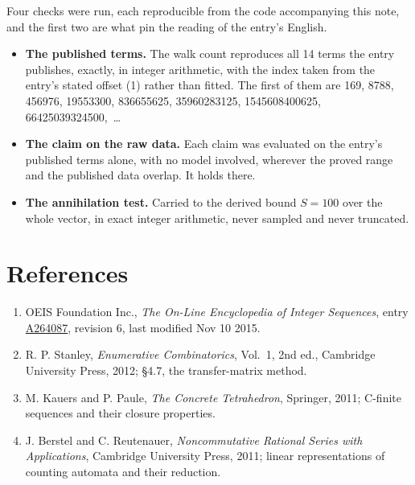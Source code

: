 \documentclass[11pt]{article}
\theoremstyle{definition}
\begin{document}
Four checks were run, each reproducible from the code accompanying this note, and the first two are what pin the reading of the entry's English.

\begin{itemize}

\item {\bfseries The published terms.} The walk count reproduces all 14 terms the entry publishes, exactly, in integer arithmetic, with the index taken from the entry's stated offset (1) rather than fitted. The first of them are 169, 8788, 456976, 19553300, 836655625, 35960283125, 1545608400625, 66425039324500,~\dots

\item {\bfseries The claim on the raw data.} Each claim was evaluated on the entry's published terms alone, with no model involved, wherever the proved range and the published data overlap. It holds there.

\item {\bfseries The annihilation test.} Carried to the derived bound $S = 100$ over the whole vector, in exact integer arithmetic, never sampled and never truncated.

\end{itemize}

\section{References}

\begin{enumerate}

\item OEIS Foundation Inc., \emph{The On-Line Encyclopedia of Integer Sequences}, entry \href{https://oeis.org/A264087}{A264087}, revision 6, last modified Nov 10 2015.

\item R. P. Stanley, \emph{Enumerative Combinatorics}, Vol.~1, 2nd ed., Cambridge University Press, 2012; \S4.7, the transfer-matrix method.

\item M. Kauers and P. Paule, \emph{The Concrete Tetrahedron}, Springer, 2011; C-finite sequences and their closure properties.

\item J. Berstel and C. Reutenauer, \emph{Noncommutative Rational Series with Applications}, Cambridge University Press, 2011; linear representations of counting automata and their reduction.

\end{enumerate}
\end{document}
